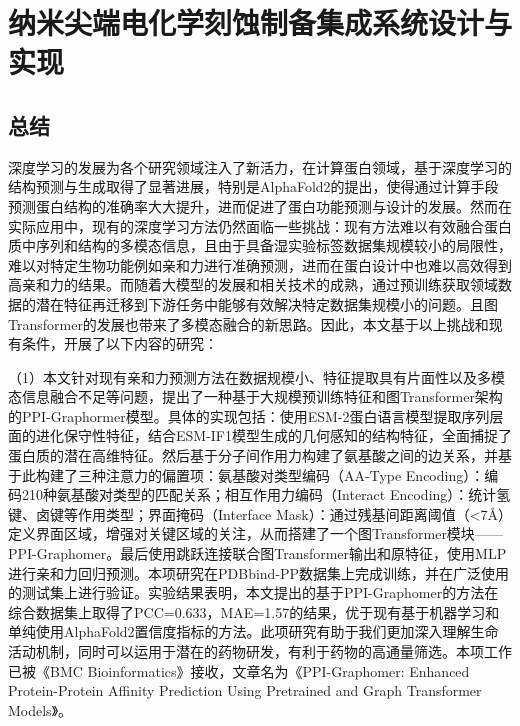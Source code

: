 \chapter{纳米尖端电化学刻蚀制备集成系统设计与实现}
\label{chap:conlution}

\section{总结}
深度学习的发展为各个研究领域注入了新活力，在计算蛋白领域，基于深度学习的结构预测与生成取得了显著进展，特别是AlphaFold2的提出，使得通过计算手段预测蛋白结构的准确率大大提升，进而促进了蛋白功能预测与设计的发展。然而在实际应用中，现有的深度学习方法仍然面临一些挑战：现有方法难以有效融合蛋白质中序列和结构的多模态信息，且由于具备湿实验标签数据集规模较小的局限性，难以对特定生物功能例如亲和力进行准确预测，进而在蛋白设计中也难以高效得到高亲和力的结果。而随着大模型的发展和相关技术的成熟，通过预训练获取领域数据的潜在特征再迁移到下游任务中能够有效解决特定数据集规模小的问题。且图Transformer的发展也带来了多模态融合的新思路。因此，本文基于以上挑战和现有条件，开展了以下内容的研究：

（1）本文针对现有亲和力预测方法在数据规模小、特征提取具有片面性以及多模态信息融合不足等问题，提出了一种基于大规模预训练特征和图Transformer架构的PPI-Graphormer模型。具体的实现包括：使用ESM-2蛋白语言模型提取序列层面的进化保守性特征，结合ESM-IF1模型生成的几何感知的结构特征，全面捕捉了蛋白质的潜在高维特征。然后基于分子间作用力构建了氨基酸之间的边关系，并基于此构建了三种注意力的偏置项：氨基酸对类型编码（AA-Type Encoding）：编码210种氨基酸对类型的匹配关系；相互作用力编码（Interact Encoding）：统计氢键、卤键等作用类型；界面掩码（Interface Mask）：通过残基间距离阈值（<7Å）定义界面区域，增强对关键区域的关注，从而搭建了一个图Transformer模块——PPI-Graphomer。最后使用跳跃连接联合图Transformer输出和原特征，使用MLP进行亲和力回归预测。本项研究在PDBbind-PP数据集上完成训练，并在广泛使用的测试集上进行验证。实验结果表明，本文提出的基于PPI-Graphomer的方法在综合数据集上取得了PCC=0.633，MAE=1.57的结果，优于现有基于机器学习和单纯使用AlphaFold2置信度指标的方法。此项研究有助于我们更加深入理解生命活动机制，同时可以运用于潜在的药物研发，有利于药物的高通量筛选。本项工作已被《BMC Bioinformatics》接收，文章名为《PPI-Graphomer: Enhanced Protein-Protein Affinity Prediction Using Pretrained and Graph Transformer Models》。

